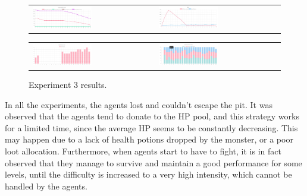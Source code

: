 \begin{figure}[htbp]
\begin{tabular}{ll}
    \centering
    \includegraphics[width=0.5\textwidth]{007_team_4_agent_design/figures/EX3_3.jpg}
    &
    \includegraphics[width=0.5\textwidth]{007_team_4_agent_design/figures/EX3_4.jpg}
\end{tabular}

\end{figure}


\begin{figure}[htbp]
\begin{tabular}{ll}
    \centering
    \includegraphics[width=0.5\textwidth]{007_team_4_agent_design/figures/EX3_6.jpg}
    &
    \includegraphics[width=0.5\textwidth]{007_team_4_agent_design/figures/EX3_5.jpg}
\end{tabular}
    \caption{Experiment 3 results.}
\end{figure}


\par In all the experiments, the agents lost and couldn't escape the pit. It was observed that the agents tend to donate to the HP pool, and this strategy works for a limited time, since the average HP seems to be constantly decreasing. This may happen due to a lack of health potions dropped by the monster, or a poor loot allocation. Furthermore, when agents start to have to fight, it is in fact observed that they manage to survive and maintain a good performance for some levels, until the difficulty is increased to a very high intensity, which cannot be handled by the agents.


